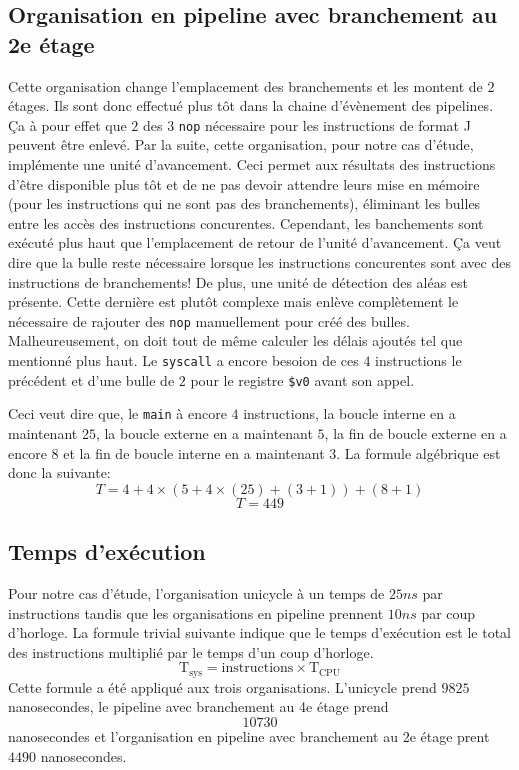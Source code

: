 \documentclass[a11paper]{article}
\newcommand{\todo}[1]{\begin{color}{Red}\textbf{TODO:} #1\end{color}}
\begin{document}
\subsection{Organisation en pipeline avec branchement au 2e étage}
Cette organisation change l'emplacement des branchements et les montent de $2$ étages. Ils sont donc effectué plus tôt dans la chaine d'évènement des pipelines. Ça à pour effet que
$2$ des $3$ \verb|nop| nécessaire pour les instructions de format J peuvent être enlevé. Par la suite, cette organisation, pour notre cas d'étude, implémente une unité d'avancement.
Ceci permet aux résultats des instructions d'être disponible plus tôt et de ne pas devoir attendre leurs mise en mémoire (pour les instructions qui ne sont pas des branchements), 
éliminant les bulles entre les accès des instructions concurentes. Cependant, les banchements sont exécuté plus haut que l'emplacement de retour de l'unité d'avancement. Ça veut dire
que la bulle reste nécessaire lorsque les instructions concurentes sont avec des instructions de branchements!
De plus, une unité de détection des aléas est présente. Cette dernière est plutôt complexe mais enlève 
complètement le nécessaire de rajouter des \verb|nop| manuellement pour créé des bulles. Malheureusement, on doit tout de même calculer les délais ajoutés tel que mentionné plus haut.
Le \verb|syscall| a encore besoion de ces $4$ instructions le précédent et d'une bulle de $2$ pour le registre \verb|$v0| avant son appel.

Ceci veut dire que, le \verb|main| à encore $4$ instructions, la boucle interne en a maintenant $25$, la boucle externe en a maintenant $5$, la fin de boucle externe en a encore $8$
et la fin de boucle interne en a maintenant $3$. La formule algébrique est donc la suivante:
$$
T = 4+ 4\times(5+4\times(25)+(3+1)) + (8+1)
$$
$$
T = 449
$$

\subsection{Temps d'exécution}
Pour notre cas d'étude, l'organisation unicycle à un temps de $25ns$ par instructions tandis que les organisations en pipeline prennent $10ns$ par coup d'horloge.
La formule trivial suivante indique que le temps d'exécution est le total des instructions multiplié par le temps d'un coup d'horloge.
$$
\text{T}_{\text{sys}} = \text{instructions}\times\text{T}_{\text{CPU}}
$$
Cette formule a été appliqué aux trois organisations. L'unicycle prend $9825$ nanosecondes, le pipeline avec branchement au 4e étage prend $$10730$$ nanosecondes et l'organisation en pipeline
avec branchement au 2e étage prent $4490$ nanosecondes.
\end{document}
